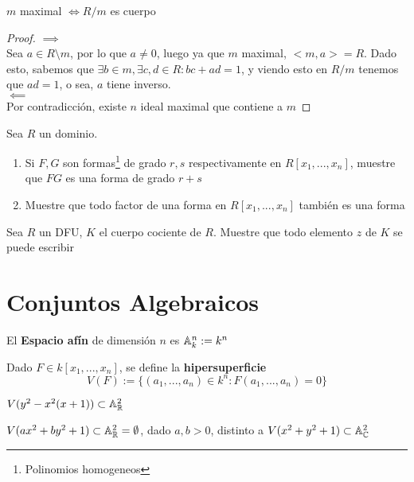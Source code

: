 \begin{thm}
    $m$ maximal $\iff R/m$  es cuerpo
\end{thm}
\begin{proof}
    $\implies$\\
    Sea $a\in R\setminus m$, por lo que $a\neq0$, luego ya que $m$ maximal, $<m, a>=R$. Dado esto, sabemos que $\exists b\in m, \exists c,d\in R: bc+ad=1$, y viendo esto en $R/m$ tenemos que $ad=1$, o sea, $a$ tiene inverso.\\
    $\impliedby$\\
    Por contradicción, existe $n$ ideal maximal que contiene a $m$
\end{proof}

\begin{prob}
    Sea $R$ un dominio.
    \begin{enumerate}
        \item Si $F,G$ son formas\footnote{Polinomios homogeneos} de grado $r,s$ respectivamente en $R[x_1,...,x_n]$, muestre que $FG$ es una forma de grado $r+s$
        \item Muestre que todo factor de una forma en $R[x_1,...,x_n]$ también es una forma
    \end{enumerate}
\end{prob}

\begin{prob}
    Sea $R$ un DFU, $K$ el cuerpo cociente de $R$. Muestre que todo elemento $z$ de $K$ se puede escribir
\end{prob}

\section{Conjuntos Algebraicos}
\begin{defn}
    El \textbf{Espacio afín} de  dimensión $n$ es $\mathbb{A}_k^n:=k^n$
\end{defn}
\begin{defn}[Hipersuperficie]
    Dado $F\in k[x_1,...,x_n]$, se define la \textbf{hipersuperficie}
    \[
        V(F):=\{(a_1,...,a_n)\in k^n: F(a_1,...,a_n)=0\}
    \]
\end{defn}

\begin{ejm}
    $V(y^2-x^2(x+1))\subset\mathbb{A}_{\mathbb{R}}^2$ %
\end{ejm}

\begin{ejm}
    $V(ax^2+by^2+1)\subset\mathbb{A}_{\mathbb{R}}^2=\emptyset$, dado $a,b>0$, distinto a $V(x^2+y^2+1)\subset\mathbb{A}_{\mathbb{C}}^2$
\end{ejm}

